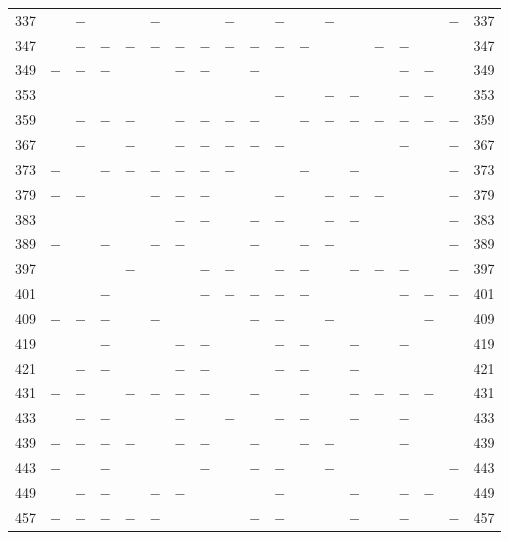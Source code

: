 \begin{center}
\begin{tabular}{r|c|c|c|c|c|c|c|c|c|c|c|c|c|c|c|c|c|r}
337 &  & $-$ &  &  & $-$ &  &  & $-$ &  & $-$ &  & $-$ &  &  &  &  & $-$ & 337\\
347 &  & $-$ & $-$ & $-$ & $-$ & $-$ & $-$ & $-$ & $-$ & $-$ & $-$ &  &  & $-$ & $-$ &  &  & 347\\
349 & $-$ & $-$ & $-$ &  &  & $-$ & $-$ &  & $-$ &  &  &  &  &  & $-$ & $-$ &  & 349\\
353 &  &  &  &  &  &  &  &  &  & $-$ &  & $-$ & $-$ &  & $-$ & $-$ &  & 353\\
359 &  & $-$ & $-$ & $-$ &  & $-$ & $-$ & $-$ & $-$ &  & $-$ & $-$ & $-$ & $-$ & $-$ & $-$ & $-$ & 359\\
367 &  & $-$ &  & $-$ &  & $-$ & $-$ & $-$ & $-$ & $-$ &  &  &  &  & $-$ &  & $-$ & 367\\
373 & $-$ &  & $-$ & $-$ & $-$ & $-$ & $-$ & $-$ &  &  & $-$ &  & $-$ &  &  &  & $-$ & 373\\
379 & $-$ & $-$ &  &  & $-$ & $-$ & $-$ &  &  & $-$ &  & $-$ & $-$ & $-$ &  &  & $-$ & 379\\
383 &  &  &  &  &  & $-$ & $-$ &  & $-$ & $-$ &  & $-$ & $-$ &  &  &  & $-$ & 383\\
389 & $-$ &  & $-$ &  & $-$ & $-$ &  &  & $-$ &  & $-$ & $-$ &  &  &  &  & $-$ & 389\\
397 &  &  &  & $-$ &  &  & $-$ & $-$ &  & $-$ & $-$ &  & $-$ & $-$ & $-$ &  & $-$ & 397\\
401 &  &  & $-$ &  &  &  & $-$ & $-$ & $-$ & $-$ & $-$ &  &  &  & $-$ & $-$ & $-$ & 401\\
409 & $-$ & $-$ & $-$ &  & $-$ &  &  &  & $-$ & $-$ &  & $-$ &  &  &  & $-$ &  & 409\\
419 &  &  & $-$ &  &  & $-$ & $-$ &  &  & $-$ & $-$ &  & $-$ &  & $-$ &  &  & 419\\
421 &  & $-$ & $-$ &  &  & $-$ & $-$ &  &  & $-$ & $-$ &  & $-$ &  &  &  &  & 421\\
431 & $-$ & $-$ &  & $-$ & $-$ & $-$ & $-$ &  & $-$ &  & $-$ &  & $-$ & $-$ & $-$ & $-$ &  & 431\\
433 &  & $-$ & $-$ &  &  & $-$ &  & $-$ &  & $-$ & $-$ &  & $-$ &  & $-$ &  &  & 433\\
439 & $-$ & $-$ & $-$ & $-$ &  & $-$ & $-$ &  & $-$ &  & $-$ & $-$ &  &  & $-$ &  &  & 439\\
443 & $-$ &  & $-$ &  &  &  & $-$ &  & $-$ & $-$ &  & $-$ &  &  &  &  & $-$ & 443\\
449 &  & $-$ & $-$ &  & $-$ & $-$ &  &  &  & $-$ &  &  & $-$ &  & $-$ & $-$ &  & 449\\
457 & $-$ & $-$ & $-$ & $-$ & $-$ &  &  &  & $-$ & $-$ &  &  & $-$ &  & $-$ &  & $-$ & 457\\

\end{tabular}
\end{center}
